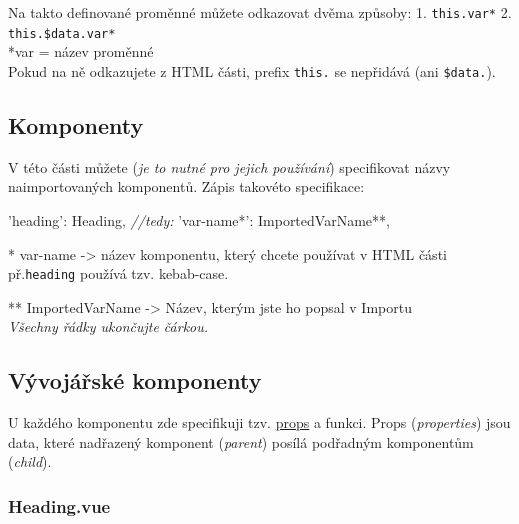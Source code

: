\documentclass[
]{article}
\newenvironment{Shaded}{}{}
\newcommand{\CommentTok}[1]{\textcolor[rgb]{0.38,0.63,0.69}{\textit{#1}}}
\newcommand{\NormalTok}[1]{#1}
\newcommand{\OperatorTok}[1]{\textcolor[rgb]{0.40,0.40,0.40}{#1}}
\newcommand{\StringTok}[1]{\textcolor[rgb]{0.25,0.44,0.63}{#1}}
\begin{document}
Na takto definované proměnné můžete odkazovat dvěma způsoby: 1.
\texttt{this.var*} 2. \texttt{this.\$data.var*}\\
*var = název proměnné\\
Pokud na ně odkazujete z HTML části, prefix \texttt{this.} se nepřidává
(ani \texttt{\$data.}).

\hypertarget{komponenty}{%
\subsection{Komponenty}\label{komponenty}}

V této části můžete (\emph{je to nutné pro jejich používání})
specifikovat názvy naimportovaných komponentů. Zápis takovéto
specifikace:

\begin{Shaded}
\begin{Highlighting}[]
\StringTok{'heading'}\OperatorTok{:}\NormalTok{ Heading}\OperatorTok{,}
\CommentTok{//tedy:}
\StringTok{'var-name*'}\OperatorTok{:}\NormalTok{ ImportedVarName}\OperatorTok{**,}
\end{Highlighting}
\end{Shaded}

* var-name -\textgreater{} název komponentu, který chcete používat v
HTML části\\
př.\texttt{\textquotesingle{}heading\textquotesingle{}} používá tzv.
kebab-case.

** ImportedVarName -\textgreater{} Název, kterým jste ho popsal v
Importu\\

\emph{Všechny řádky ukončujte čárkou.}

\hypertarget{vuxfdvojuxe1ux159skuxe9-komponenty}{%
\subsection{Vývojářské
komponenty}\label{vuxfdvojuxe1ux159skuxe9-komponenty}}

U každého komponentu zde specifikuji tzv.
\href{https://vuejs.org/v2/guide/components-props.html}{props} a funkci.
Props (\emph{properties}) jsou data, které nadřazený komponent
(\emph{parent}) posílá podřadným komponentům (\emph{child}).

\hypertarget{heading.vue}{%
\subsubsection{Heading.vue}\label{heading.vue}}
\end{document}
